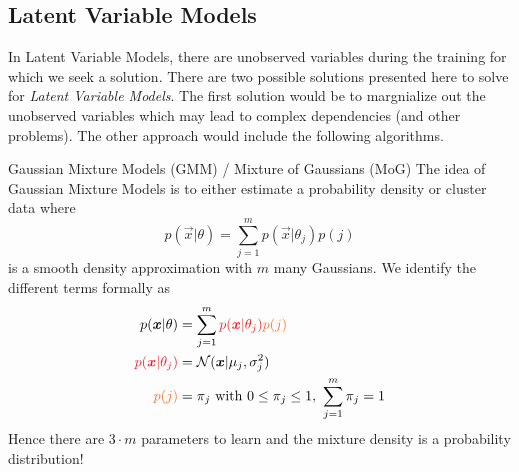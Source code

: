 \subsection{Latent Variable Models}
In Latent Variable Models, there are unobserved variables during the training for which we seek a solution. %
There are two possible solutions presented here to solve for \emph{Latent Variable Models}. %
The first solution would be to margnialize out the unobserved variables which may lead to complex dependencies (and other problems). %
The other approach would include the following algorithms. %
\newpage
\begin{topic}{0.3cm}{Gaussian Mixture Models (GMM) / Mixture of Gaussians (MoG)}
	The idea of Gaussian Mixture Models is to either estimate a probability density or cluster data where %
	\begin{equation}
		p(\vec{x}|\theta) = \sum_{j=1}^m p(\vec{x}|\theta_j) p(j)
	\end{equation}
	is a smooth density approximation with \ensuremath{m} many Gaussians. %
	We identify the different terms formally as %
	\begin{align}
		p(\vec{x}|\theta) &= \sum_{j=1}^m {\color{Red}p(\vec{x}|\theta_j)} {\color{Orange}p(j)} \\
		{\color{Red} p(\vec{x}|\theta_j)} &= \mathcal{N}(\vec{x}|\mu_j,\sigma^2_j) \\
		{\color{Orange} p(j)} &= \pi_j \text{ with } 0\leq\pi_j \leq 1, ~\sum_{j=1}^m \pi_j = 1
	\end{align}
	Hence there are \ensuremath{3\cdot m} parameters to learn and the mixture density is a probability distribution! %
	

\end{topic}

